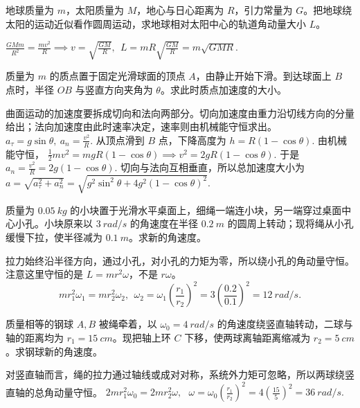 \begin{exercise}
地球质量为 \(m\)，太阳质量为 \(M\)，地心与日心距离为 \(R\)，引力常量为 \(G\)。把地球绕太阳的运动近似看作圆周运动，求地球相对太阳中心的轨道角动量大小 \(L\)。
\end{exercise}
\begin{solution}
 \(\frac{GMm}{R^2}=\frac{mv^2}{R} \implies v=\sqrt{\frac{GM}{R}},~~L=mR\sqrt{\frac{GM}{R}} =m\sqrt{GMR}.\) 
\end{solution}


\begin{exercise}
质量为 \(m\) 的质点置于固定光滑球面的顶点 \(A\)，由静止开始下滑。到达球面上 \(B\) 点时，半径 \(OB\) 与竖直方向夹角为 \(\theta\)。求此时质点加速度的大小。
\end{exercise}

\begin{solution}
曲面运动的加速度要拆成切向和法向两部分。切向加速度由重力沿切线方向的分量给出；法向加速度由此时速率决定，速率则由机械能守恒求出。
 \(a_\tau=g\sin\theta,~a_n=\frac{v^2}{R}.\) 
从顶点滑到 \(B\) 点，下降高度为
 \(h=R(1-\cos\theta).\) 
由机械能守恒，
 \(\frac12 mv^2=mgR(1-\cos\theta) \implies v^2=2gR(1-\cos\theta).\) 
于是
 \(a_n=\frac{v^2}{R}=2g(1-\cos\theta).\) 
切向与法向互相垂直，所以总加速度大小为
 \(a=\sqrt{a_\tau^2+a_n^2} =\sqrt{g^2\sin^2\theta+4g^2(1-\cos\theta)^2}.\) 
\end{solution}


\begin{exercise}
质量为 \(\SI{0.05}{kg}\) 的小块置于光滑水平桌面上，细绳一端连小块，另一端穿过桌面中心小孔。小块原来以 \(\SI{3}{rad/s}\) 的角速度在半径 \(\SI{0.2}{m}\) 的圆周上转动；现将绳从小孔缓慢下拉，使半径减为 \(\SI{0.1}{m}\)。求新的角速度。
\end{exercise}
\begin{solution}
拉力始终沿半径方向，通过小孔，对小孔的力矩为零，所以绕小孔的角动量守恒。注意这里守恒的是 \(L=mr^2\omega\)，不是 \(r\omega\)。
\[
mr_1^2\omega_1=mr_2^2\omega_2,~~\omega_2=\omega_1\left(\frac{r_1}{r_2}\right)^2
=3\left(\frac{0.2}{0.1}\right)^2
=\SI{12}{rad/s}.
\]
\end{solution}

\begin{exercise}
质量相等的钢球 \(A,B\) 被绳牵着，以 \(\omega_0=\SI{4}{rad/s}\) 的角速度绕竖直轴转动，二球与轴的距离均为 \(r_1=\SI{15}{cm}\)。现把轴上环 \(C\) 下移，使两球离轴距离缩减为 \(r_2=\SI{5}{cm}\)。求钢球新的角速度。
\end{exercise}
\begin{solution}
对竖直轴而言，绳的拉力通过轴线或成对对称，系统外力矩可忽略，所以两球绕竖直轴的总角动量守恒。
 \(2mr_1^2\omega_0=2mr_2^2\omega,~~~ \omega=\omega_0\left(\frac{r_1}{r_2}\right)^2 =4\left(\frac{15}{5}\right)^2 =\SI{36}{rad/s}.\) 
\end{solution}

